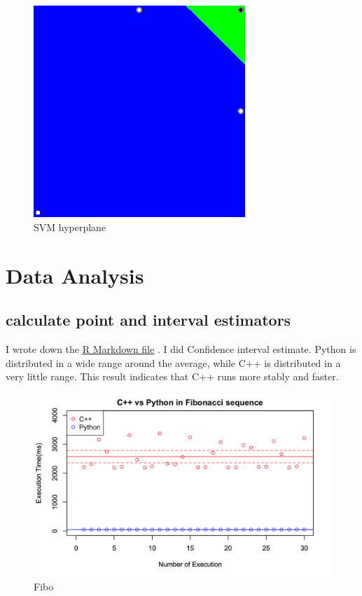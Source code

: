 \documentclass[11pt, a4paper]{article}
\begin{document}
\begin{figure}[htbp]
\centering
\includegraphics[clip, width=80mm]{result.png}
\caption{SVM hyperplane}
\end{figure}

\section{Data Analysis}
\subsection{calculate point and interval estimators}

I wrote down the \href{https://github.com/Rintarooo/time_cpp_python/blob/master/rmarkdown/ds.Rmd}{\underline{R Markdown file}} . I did Confidence interval estimate. Python is distributed in a wide range around the average, while C++ is distributed in a very little range. This result indicates that C++ runs more stably and faster. 

\begin{figure}[htbp]
\centering
\includegraphics[clip, width=200mm]{00002d.png}
\caption{Fibo}
\end{figure}
\end{document}
